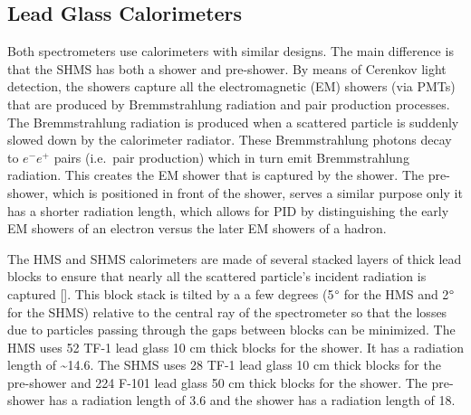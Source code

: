 \documentclass[
]{report}
\begin{document}
\hypertarget{lead-glass-calorimeters}{%
\subsection{\texorpdfstring{Lead Glass Calorimeters
\label{Chapter-2-5-4}}{Lead Glass Calorimeters }}\label{lead-glass-calorimeters}}

Both spectrometers use calorimeters with similar designs. The main
difference is that the SHMS has both a shower and pre-shower. By means
of Cerenkov light detection, the showers capture all the electromagnetic
(EM) showers (via PMTs) that are produced by Bremmstrahlung radiation
and pair production processes. The Bremmstrahlung radiation is produced
when a scattered particle is suddenly slowed down by the calorimeter
radiator. These Bremmstrahlung photons decay to \(e^-e^+\) pairs
(i.e.~pair production) which in turn emit Bremmstrahlung radiation. This
creates the EM shower that is captured by the shower. The pre-shower,
which is positioned in front of the shower, serves a similar purpose
only it has a shorter radiation length, which allows for PID by
distinguishing the early EM showers of an electron versus the later EM
showers of a hadron.



The HMS and SHMS calorimeters are made of several stacked layers of
thick lead blocks to ensure that nearly all the scattered particle's
incident radiation is captured {[}\cite{mkrtchyan_lead-glass_2013}{]}.
This block stack is tilted by a a few degrees (5\(\degree\) for the HMS
and 2\(\degree\) for the SHMS) relative to the central ray of the
spectrometer so that the losses due to particles passing through the
gaps between blocks can be minimized. The HMS uses 52 TF-1 lead glass 10
cm thick blocks for the shower. It has a radiation length of
\textasciitilde14.6. The SHMS uses 28 TF-1 lead glass 10 cm thick blocks
for the pre-shower and 224 F-101 lead glass 50 cm thick blocks for the
shower. The pre-shower has a radiation length of 3.6 and the shower has
a radiation length of 18.

\label{Chapter-2-6}
\end{document}
